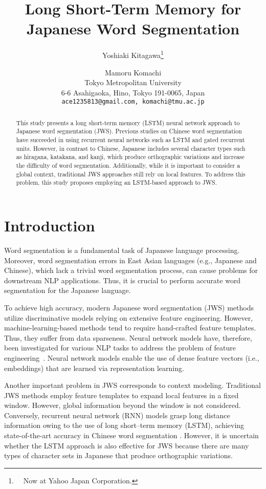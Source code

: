 \documentclass[11pt]{article}
\title{Long Short-Term Memory for Japanese Word Segmentation}
\author{
Yoshiaki Kitagawa\thanks{~~Now at Yahoo Japan Corporation.} \and Mamoru Komachi \\
Tokyo Metropolitan University\\
  6-6 Asahigaoka, Hino, Tokyo 191-0065, Japan\\
  {\tt ace1235813@gmail.com, komachi@tmu.ac.jp}
}
\date{}
\begin{document}
\maketitle

\begin{abstract}
This study presents a long short-term memory (LSTM) neural network approach to Japanese word segmentation (JWS). 
Previous studies on Chinese word segmentation have succeeded in using recurrent neural networks such as LSTM and gated recurrent units. 
However, in contrast to Chinese, Japanese includes several character types
    such as hiragana, katakana, and kanji, which produce orthographic
    variations and increase the difficulty of word segmentation. 
Additionally, while it is important to consider a global context,
traditional JWS approaches still rely on local features.
To address this problem, this study proposes employing an LSTM-based approach
to JWS.

\end{abstract}

\section{Introduction}
Word segmentation is a fundamental task of Japanese language processing. 
Moreover, word segmentation errors in East Asian languages (e.g., Japanese and
Chinese), which lack a trivial word segmentation process, can cause problems
for downstream NLP applications.
Thus, it is crucial to perform accurate word segmentation for the Japanese
language.



To achieve high accuracy, modern Japanese word segmentation (JWS) methods
utilize discriminative models relying on extensive feature engineering.
However, machine-learning-based methods tend to require hand-crafted feature
templates. Thus, they suffer from data sparseness.
Neural network models have, therefore, been investigated for various NLP tasks
to address the problem of feature engineering~\cite{liu2015multi,sutskever2014sequence,socher2013parsing,turian2010word,mikolov2013distributed}.
Neural network models enable the use of dense feature vectors (i.e.,
embeddings) that are learned via representation learning.

Another important problem in JWS corresponds to context modeling. Traditional
JWS methods employ feature templates to expand local features in a fixed
window. However, global information beyond the window is not considered.
Conversely, recurrent neural network (RNN) models grasp long distance
information owing to the use of long short--term memory (LSTM), achieving
state-of-the-art accuracy in Chinese word segmentation \cite{chen-EtAl:2015:EMNLP2}. 
However, it is uncertain whether the LSTM approach is also effective for JWS
because there are many types of character sets in Japanese that produce
orthographic variations.
\end{document}

